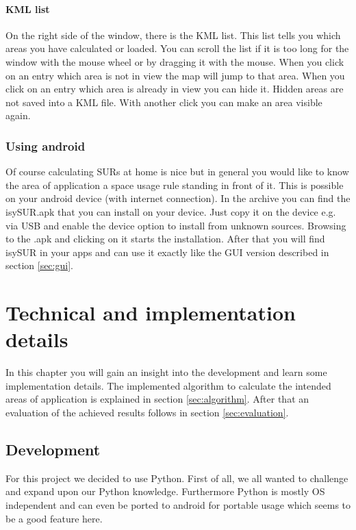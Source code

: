 \documentclass[11pt,fleqn]{book} %
\newcommand{\todol}{\todo[inline]} %
\begin{document}
\subsubsection{KML list}
On the right side of the window, there is the KML list. This list tells you which areas you have calculated or loaded. You can scroll the list if it is too long for the window with the mouse wheel or by dragging it with the mouse. When you click on an entry which area is not in view the map will jump to that area. When you click on an entry which area is already in view you can hide it. Hidden areas are not saved into a KML file. With another click you can make an area visible again.

\subsection{Using android}\label{sec:android}
Of course calculating SURs at home is nice but in general you would like to know the area of application a space usage rule standing in front of it. This is possible on your android device (with internet connection). In the archive you can find the isySUR.apk that you can install on your device. Just copy it on the device e.g. via USB and enable the device option to install from unknown sources. Browsing to the .apk and clicking on it starts the installation. After that you will find isySUR in your apps and can use it exactly like the GUI version described in section \ref{sec:gui}.


\chapter{Technical and implementation details}
In this chapter you will gain an insight into the development and learn some implementation details. The implemented algorithm to calculate the intended areas of application is explained in section \ref{sec:algorithm}. After that an evaluation of the achieved results follows in section \ref{sec:evaluation}.

\todol{Code documentation -> pydoc?}

\section{Development}
For this project we decided to use Python. First of all, we all wanted to challenge and expand upon our Python knowledge. Furthermore Python is mostly OS independent and can even be ported to android for portable usage which seems to be a good feature here.
\end{document}
